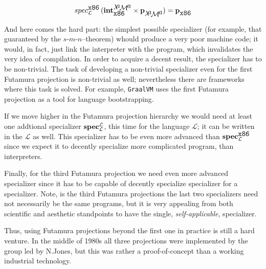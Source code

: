 \[
\SpecS{\mbox{\texttt{x86}}}{\mathcal{L}}\,(\Int{\mbox{\lama}}{\mbox{\texttt{x86}}}\times \primi{p}^\ph_{\mbox{\lama}})=\primi{p}^\ph_{\mbox{\texttt{x86}}}
\]


And here comes the hard part: the simplest possible specializer (for example, that guaranteed by the $s$-$m$-$n$--theorem) whould produce a very
poor machine code; it would, in fact, just link the interpreter with the program, which invalidates the very idea of compilation. In order to
acquire a decent result, the specializer has to be non-trivial. The task of developing a non-trivial specializer even for the first Futamura
projection is non-trivial as well; nevertheless there are frameworks where this task is solved. For example, \texttt{GraalVM} uses the first Futamura projection
as a tool for language bootstrapping.

If we move higher in the Futamura projection hierarchy we would need at least one addtional specializer $\mathbf{spec}^{\mathcal{L}}_{\mathcal {L}}$, this time
for the language $\mathcal{L}$; it can be written in the $\mathcal{L}$ as well. This specializer has to be even more advanced than
$\mathbf{spec}^{\mathcal{\mbox{\texttt{x86}}}}_{\mathcal {\mathcal{L}}}$ since we expect it to decently specialize more complicated program, than interpreters.

Finally, for the third Futamura projection we need even more advanced specializer since it has to be capable of decently specialize specializer for a
specializer. Note, is the third Futamura projections the last two specializers need not necessarily be the same programs, but it is very
appealing from both scientific and aesthetic standpoints to have the single, \emph{self-applicable}, specializer.

Thus, using Futamura projections beyond the first one in practice is still a hard venture. In the middle of 1980s all three projections were
implemented by the group led by N.Jones, but this was rather a proof-of-concept than a working industrial technology.

